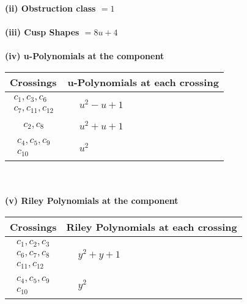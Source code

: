 \documentclass[1p]{elsarticle_modified}
\theoremstyle{definition}
\begin{document}
\flushleft \textbf{(ii) Obstruction class $= 1$}\\~\\
\flushleft \textbf{(iii) Cusp Shapes $= 8 u+4$}\\~\\
\newpage\renewcommand{\arraystretch}{1}
\flushleft \textbf{(iv) u-Polynomials at the component}\newline \\
\begin{tabular}{m{50pt}|m{274pt}}
Crossings & \hspace{64pt}u-Polynomials at each crossing \\
\hline $$\begin{aligned}c_{1},c_{3},c_{6}\\c_{7},c_{11},c_{12}\end{aligned}$$&$\begin{aligned}
&u^2- u+1
\end{aligned}$\\
\hline $$\begin{aligned}c_{2},c_{8}\end{aligned}$$&$\begin{aligned}
&u^2+u+1
\end{aligned}$\\
\hline $$\begin{aligned}c_{4},c_{5},c_{9}\\c_{10}\end{aligned}$$&$\begin{aligned}
&u^2
\end{aligned}$\\
\hline
\end{tabular}\\~\\
\newpage\renewcommand{\arraystretch}{1}
\flushleft \textbf{(v) Riley Polynomials at the component}\newline \\
\begin{tabular}{m{50pt}|m{274pt}}
Crossings & \hspace{64pt}Riley Polynomials at each crossing \\
\hline $$\begin{aligned}c_{1},c_{2},c_{3}\\c_{6},c_{7},c_{8}\\c_{11},c_{12}\end{aligned}$$&$\begin{aligned}
&y^2+y+1
\end{aligned}$\\
\hline $$\begin{aligned}c_{4},c_{5},c_{9}\\c_{10}\end{aligned}$$&$\begin{aligned}
&y^2
\end{aligned}$\\
\hline
\end{tabular}\\~\\
\end{document}
